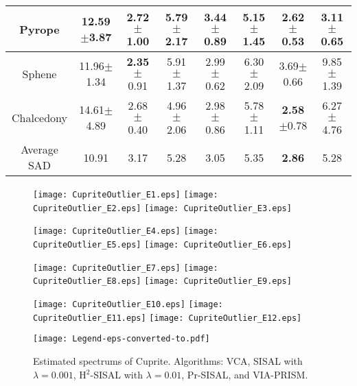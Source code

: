 \documentclass[10pt,twocolumn,twoside]{IEEEtran}
\begin{document}
\begin{table}[!hbt]
{\begin{tabular}{c||c|c|c|c|c|c|c}
			\hline
			Pyrope 			& 12.59$\pm$3.87 & 2.72$\pm$1.00  		   & 5.79$\pm$2.17  & 3.44$\pm$0.89  		  & 5.15$\pm$1.45  &  \textbf{2.62} $\pm$0.53 & 3.11$\pm$0.65  \\
			\hline
			Sphene 			& 11.96$\pm$1.34 & \textbf{2.35}$\pm$0.91  & 5.91$\pm$1.37  & 2.99$\pm$0.62  		  & 6.30$\pm$2.09  &  3.69$\pm$0.66 		  & 9.85$\pm$1.39  \\
			\hline
			Chalcedony 		& 14.61$\pm$4.89 & 2.68$\pm$0.40  		   & 4.96$\pm$2.06  & 2.98$\pm$0.86  		  & 5.78$\pm$1.11  &  \textbf{2.58} $\pm$0.78 & 6.27$\pm$4.76  \\
			\hline\hline
			Average SAD   	& 10.91          & 3.17  		           & 5.28 			& 3.05 					  & 5.35 		   & \textbf{2.86} 			  & 5.28  \\
			\hline
	\end{tabular}}
	\label{Tab:CupriteExpOutliers}
\end{table}


\begin{figure}[htb!]
	\centering
	\begin{minipage}[b]{\textwidth}
		\centering
		\texttt{[image: CupriteOutlier\_E1.eps]}
		\texttt{[image: CupriteOutlier\_E2.eps]}
		\texttt{[image: CupriteOutlier\_E3.eps]}
		\vspace{0.1in}
	\end{minipage}
	\begin{minipage}[b]{\textwidth}
		\centering
		\texttt{[image: CupriteOutlier\_E4.eps]}
		\texttt{[image: CupriteOutlier\_E5.eps]}
		\texttt{[image: CupriteOutlier\_E6.eps]}
		\vspace{0.1in}
	\end{minipage}
	\begin{minipage}[b]{\textwidth}
		\centering
		\texttt{[image: CupriteOutlier\_E7.eps]}
		\texttt{[image: CupriteOutlier\_E8.eps]}
		\texttt{[image: CupriteOutlier\_E9.eps]}
		\vspace{0.1in}
	\end{minipage}
	\begin{minipage}[b]{\textwidth}
		\centering
		\texttt{[image: CupriteOutlier\_E10.eps]}
		\texttt{[image: CupriteOutlier\_E11.eps]}
		\texttt{[image: CupriteOutlier\_E12.eps]}
	\end{minipage}
	\texttt{[image: Legend-eps-converted-to.pdf]}
	\caption{Estimated spectrums of Cuprite. Algorithms: VCA, SISAL with $ \lambda = 0.001 $, H$^2$-SISAL with $ \lambda = 0.01 $, Pr-SISAL, and VIA-PRISM.}\label{fig:Outlier}
\end{figure}
\end{document}
